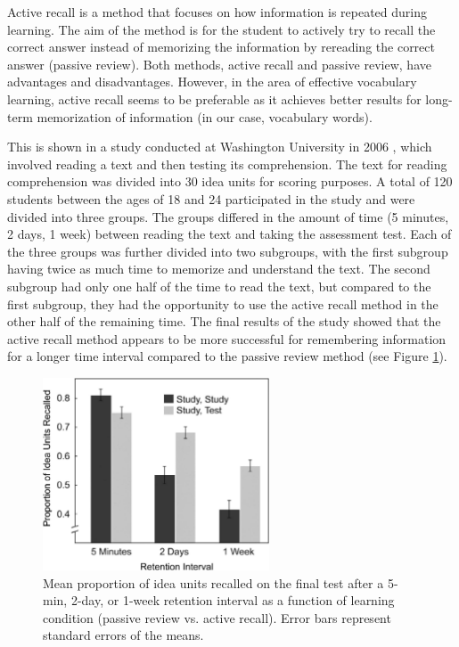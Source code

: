 Active recall is a method that focuses on how information is repeated during learning. The aim of the method is for the student to actively try to recall the correct answer instead of memorizing the information by rereading the correct answer (passive review). Both methods, active recall and passive review, have advantages and disadvantages. However, in the area of effective vocabulary learning, active recall seems to be preferable as it achieves better results for long-term memorization of information (in our case, vocabulary words).

This is shown in a study conducted at Washington University in 2006 \cite{cite:rhkj2006_longterm_retention}, which involved reading a text and then testing its comprehension. The text for reading comprehension was divided into 30 idea units for scoring purposes. A total of 120 students between the ages of 18 and 24 participated in the study and were divided into three groups. The groups differed in the amount of time (5 minutes, 2 days, 1 week) between reading the text and taking the assessment test. Each of the three groups was further divided into two subgroups, with the first subgroup having twice as much time to memorize and understand the text. The second subgroup had only one half of the time to read the text, but compared to the first subgroup, they had the opportunity to use the active recall method in the other half of the remaining time. The final results of the study showed that the active recall method appears to be more successful for remembering information for a longer time interval compared to the passive review method (see Figure \ref{fig:active-recall-passive-review-results}).

\begin{figure}[!h]
    \includegraphics[width=0.6\textwidth]{src/figures/active-recall-passive-review-results.jpeg}
    \caption{Mean proportion of idea units recalled on the final test after a 5-min, 2-day, or 1-week retention interval as a function of learning condition (passive review vs. active recall). Error bars represent standard errors of the means. \cite{cite:rhkj2006_longterm_retention}}
    \label{fig:active-recall-passive-review-results}
\end{figure}

